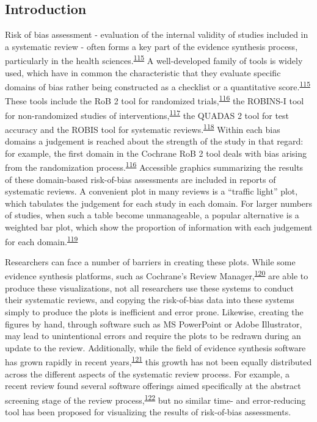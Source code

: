 \documentclass[a4paper, twoside]{templates/ociamthesis}
\begin{document}
\hypertarget{introduction-3}{%
\subsection{Introduction}\label{introduction-3}}

Risk of bias assessment - evaluation of the internal validity of studies included in a systematic review - often forms a key part of the evidence synthesis process, particularly in the health sciences.\textsuperscript{\protect\hyperlink{ref-cochranechpt7}{115}} A well-developed family of tools is widely used, which have in common the characteristic that they evaluate specific domains of bias rather being constructed as a checklist or a quantitative score.\textsuperscript{\protect\hyperlink{ref-cochranechpt7}{115}} These tools include the RoB 2 tool for randomized trials,\textsuperscript{\protect\hyperlink{ref-sterne2019rob}{116}} the ROBINS-I tool for non-randomized studies of interventions,\textsuperscript{\protect\hyperlink{ref-sterne2016robins}{117}} the QUADAS 2 tool for test accuracy and the ROBIS tool for systematic reviews.\textsuperscript{\protect\hyperlink{ref-whiting2011quadas}{118}} Within each bias domains a judgement is reached about the strength of the study in that regard: for example, the first domain in the Cochrane RoB 2 tool deals with bias arising from the randomization process.\textsuperscript{\protect\hyperlink{ref-sterne2019rob}{116}} Accessible graphics summarizing the results of these domain-based risk-of-bias assessments are included in reports of systematic reviews. A convenient plot in many reviews is a ``traffic light'' plot, which tabulates the judgement for each study in each domain. For larger numbers of studies, when such a table become unmanageable, a popular alternative is a weighted bar plot, which show the proportion of information with each judgement for each domain.\textsuperscript{\protect\hyperlink{ref-higgins2008assessing}{119}}

Researchers can face a number of barriers in creating these plots. While some evidence synthesis platforms, such as Cochrane's Review Manager,\textsuperscript{\protect\hyperlink{ref-cochrane2014review}{120}} are able to produce these visualizations, not all researchers use these systems to conduct their systematic reviews, and copying the risk-of-bias data into these systems simply to produce the plots is inefficient and error prone. Likewise, creating the figures by hand, through software such as MS PowerPoint or Adobe Illustrator, may lead to unintentional errors and require the plots to be redrawn during an update to the review. Additionally, while the field of evidence synthesis software has grown rapidly in recent years,\textsuperscript{\protect\hyperlink{ref-marshall2015systematic}{121}} this growth has not been equally distributed across the different aspects of the systematic review process. For example, a recent review found several software offerings aimed specifically at the abstract screening stage of the review process,\textsuperscript{\protect\hyperlink{ref-harrison2020software}{122}} but no similar time- and error-reducing tool has been proposed for visualizing the results of risk-of-bias assessments.
\end{document}
